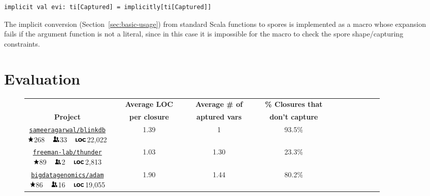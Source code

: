 \documentclass[runningheads]{llncs}
\newcommand{\myrowcolour}{\rowcolor[gray]{0.925}}
\newcommand*\loc{\includegraphics[height=0.65em,keepaspectratio]{loc}}
\newcommand*\stars{\includegraphics[height=0.8em,keepaspectratio]{stars}}
\newcommand*\contribs{\includegraphics[height=0.8em,keepaspectratio]{contribs}}
\begin{document}
\begin{sloppypar}
\begin{lstlisting}[numbers=none]
    implicit val evi: ti[Captured] = implicitly[ti[Captured]]
\end{lstlisting}
\noindent
The implicit conversion (Section~\ref{sec:basic-usage}) from standard Scala functions to spores is implemented as a macro whose expansion fails if the argument function is not a literal, since in this case it is impossible for the macro to check the spore shape/capturing constraints.



\section{Evaluation}
\label{sec:evaluation}


\begin{figure}
\begin{longtable}{c@{}c c@{}c c@{}c c@{}c c@{}c c@{}c c@{}c }
\toprule%

{\bfseries } && {\bfseries ~Average LOC~} && {\bfseries ~Average \# of~} && {\bfseries ~\% Closures that~} \\
{\bfseries Project} && {\bfseries per closure} && {\bfseries aptured vars} && {\bfseries don't capture} \\

\cmidrule(l){0-1} \cmidrule(l){2-3} \cmidrule(l){4-5} \cmidrule(l){6-7}



\parbox[c][0.9cm]{4cm}{\centering\normalsize\href{https://github.com/sameeragarwal/blinkdb}{\texttt{sameeragarwal/blinkdb}}\\ \stars 268 ~ \contribs 33 ~ \loc 22,022} && 1.39 && 1 && 93.5\% \\

\myrowcolour%
\parbox[c][0.9cm]{4cm}{\centering\normalsize\href{https://github.com/freeman-lab/thunder}{\texttt{freeman-lab/thunder}}\\ \stars 89 ~ \contribs 2 ~ \loc 2,813} && 1.03 && 1.30 && 23.3\% \\

\parbox[c][0.9cm]{4cm}{\centering\normalsize\href{https://github.com/bigdatagenomics/adam}{\texttt{bigdatagenomics/adam}}\\ \stars 86 ~ \contribs 16 ~ \loc 19,055} && 1.90 && 1.44 && 80.2\% \\


\end{longtable}
\end{figure}
\end{sloppypar}
\end{document}
